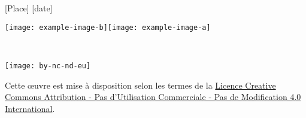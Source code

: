     [Place] [date]
    
    \begin{flushright}\texttt{[image: example-image-b]}\texttt{[image: example-image-a]}\end{flushright} %
\fi

~\vfill
\begin{center}
	\begin{minipage}[c]{0.25\linewidth}
		\texttt{[image: by-nc-nd-eu]}
	\end{minipage}\hfill
\end{center}

Cette \oe{}uvre est mise à disposition selon les termes de la \href{https://creativecommons.org/licenses/by-nc-nd/4.0/deed.fr}{Licence Creative Commons Attribution - Pas d’Utilisation Commerciale - Pas de Modification 4.0 International}. %
